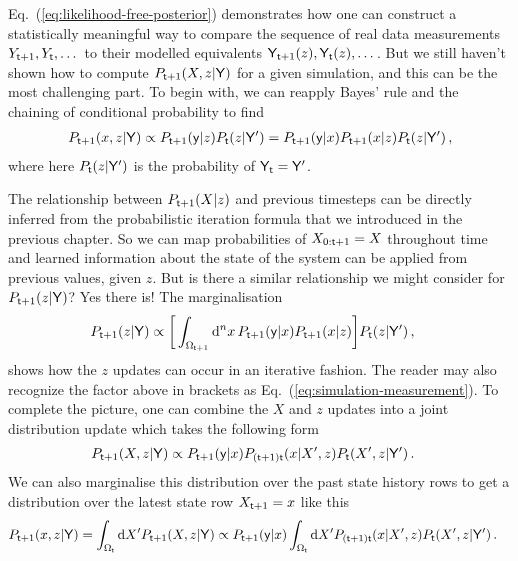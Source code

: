 Eq.~(\ref{eq:likelihood-free-posterior}) demonstrates how one can construct a statistically meaningful way to compare the sequence of real data measurements $Y_{{\sf t}+1}, Y_{{\sf t}}, \dots$ to their modelled equivalents ${\sf Y}_{{\sf t}+1}(z), {\sf Y}_{{\sf t}}(z), \dots$. But we still haven't shown how to compute $P_{{\sf t}+1}(X,z\vert {\sf Y})$ for a given simulation, and this can be the most challenging part. To begin with, we can reapply Bayes' rule and the chaining of conditional probability to find 
\begin{align}
P_{{\sf t}+1}(x,z\vert {\sf Y}) \propto P_{{\sf t}+1}({\sf y}\vert z)P_{{\sf t}}(z\vert {\sf Y}') = P_{{\sf t}+1}({\sf y}\vert x)P_{{\sf t}+1}(x\vert z)P_{{\sf t}}(z\vert {\sf Y}') \,,
\end{align}
where here $P_{{\sf t}}(z\vert {\sf Y}')$ is the probability of ${\sf Y}_{{\sf t}}={\sf Y}'$.

The relationship between $P_{{\sf t}+1}(X\vert z)$ and previous timesteps can be directly inferred from the probabilistic iteration formula that we introduced in the previous chapter. So we can map probabilities of $X_{0:{\sf t}+1} = X$ throughout time and learned information about the state of the system can be applied from previous values, given $z$. But is there a similar relationship we might consider for $P_{{\sf t}+1}(z\vert {\sf Y})$? Yes there is! The marginalisation
\begin{align} 
P_{{\sf t}+1}(z\vert {\sf Y}) &\propto \bigg[ \int_{\Omega_{{\sf t}+1}} {\rm d}^nx \,P_{{\sf t}+1}({\sf y}\vert x) P_{{\sf t}+1}(x\vert z) \bigg] P_{{\sf t}}(z\vert {\sf Y}') \label{eq:z-update}\,,
\end{align}
shows how the $z$ updates can occur in an iterative fashion. The reader may also recognize the factor above in brackets as Eq.~(\ref{eq:simulation-measurement}). To complete the picture, one can combine the $X$ and $z$ updates into a joint distribution update which takes the following form 
\begin{align} 
P_{{\sf t}+1}(X,z\vert {\sf Y}) &\propto P_{{\sf t}+1}({\sf y}\vert x) P_{({\sf t}+1){\sf t}}(x\vert X', z) P_{{\sf t}}(X',z\vert {\sf Y}') \label{eq:x-z-update}\,.
\end{align}
We can also marginalise this distribution over the past state history rows to get a distribution over the latest state row $X_{{\sf t}+1}=x$ like this 
\begin{align}
P_{{\sf t}+1}(x,z\vert {\sf Y}) &= \int_{\Omega_{{\sf t}}} {\rm d}X'P_{{\sf t}+1}(X,z\vert {\sf Y}) \propto P_{{\sf t}+1}({\sf y}\vert x) \int_{\Omega_{{\sf t}}} {\rm d}X' P_{({\sf t}+1){\sf t}}(x\vert X', z) P_{{\sf t}}(X',z\vert {\sf Y}') \label{eq:x-z-update-latest-row} \,.
\end{align}

